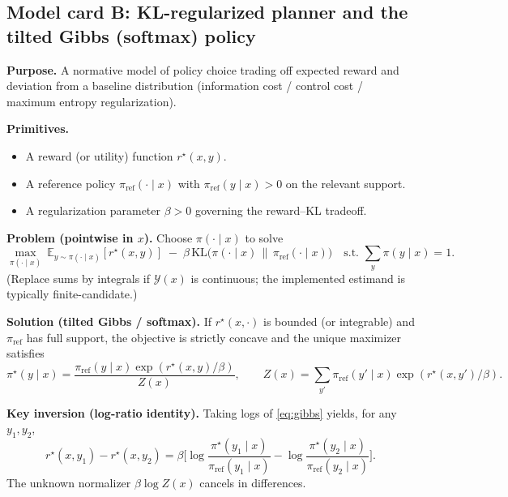 \documentclass[11pt]{article}
\newcommand{\E}{\mathbb{E}}
\newcommand{\KL}{\mathrm{KL}}
\newcommand{\1}{\mathbf{1}}
\theoremstyle{plain}
\theoremstyle{definition}
\theoremstyle{remark}
\begin{document}
\subsection{Model card B: KL-regularized planner and the tilted Gibbs (softmax) policy}
\begin{tcolorbox}[colback=white, colframe=accent, title=Model card B: KL-regularized (entropy) control around a reference policy]
\textbf{Purpose.} A normative model of policy choice trading off expected reward and deviation from a baseline
distribution (information cost / control cost / maximum entropy regularization).

\medskip
\textbf{Primitives.}
\begin{itemize}
\item A reward (or utility) function $r^\star(x,y)$.
\item A reference policy $\pi_{\mathrm{ref}}(\cdot\mid x)$ with $\pi_{\mathrm{ref}}(y\mid x)>0$ on the relevant support.
\item A regularization parameter $\beta>0$ governing the reward--KL tradeoff.
\end{itemize}

\medskip
\textbf{Problem (pointwise in $x$).} Choose $\pi(\cdot\mid x)$ to solve
\begin{equation}\label{eq:klproblem}
\max_{\pi(\cdot\mid x)}\ \E_{y\sim \pi(\cdot\mid x)}[r^\star(x,y)]\;-\;\beta\,\KL\!\big(\pi(\cdot\mid x)\,\|\,\pi_{\mathrm{ref}}(\cdot\mid x)\big)
\quad\text{s.t. } \sum_{y}\pi(y\mid x)=1.
\end{equation}
(Replace sums by integrals if $\mathcal{Y}(x)$ is continuous; the implemented estimand is typically
finite-candidate.)

\medskip
\textbf{Solution (tilted Gibbs / softmax).}
If $r^\star(x,\cdot)$ is bounded (or integrable) and $\pi_{\mathrm{ref}}$ has full support, the objective is strictly
concave and the unique maximizer satisfies
\begin{equation}\label{eq:gibbs}
\pi^\star(y\mid x)=\frac{\pi_{\mathrm{ref}}(y\mid x)\exp(r^\star(x,y)/\beta)}{Z(x)},\qquad
Z(x)=\sum_{y'}\pi_{\mathrm{ref}}(y'\mid x)\exp(r^\star(x,y')/\beta).
\end{equation}

\medskip
\textbf{Key inversion (log-ratio identity).}
Taking logs of \eqref{eq:gibbs} yields, for any $y_1,y_2$,
\begin{equation}\label{eq:logratio}
r^\star(x,y_1)-r^\star(x,y_2)=\beta\Big[\log\frac{\pi^\star(y_1\mid x)}{\pi_{\mathrm{ref}}(y_1\mid x)}-\log\frac{\pi^\star(y_2\mid x)}{\pi_{\mathrm{ref}}(y_2\mid x)}\Big].
\end{equation}
The unknown normalizer $\beta\log Z(x)$ cancels in differences.


\end{tcolorbox}
\end{document}
